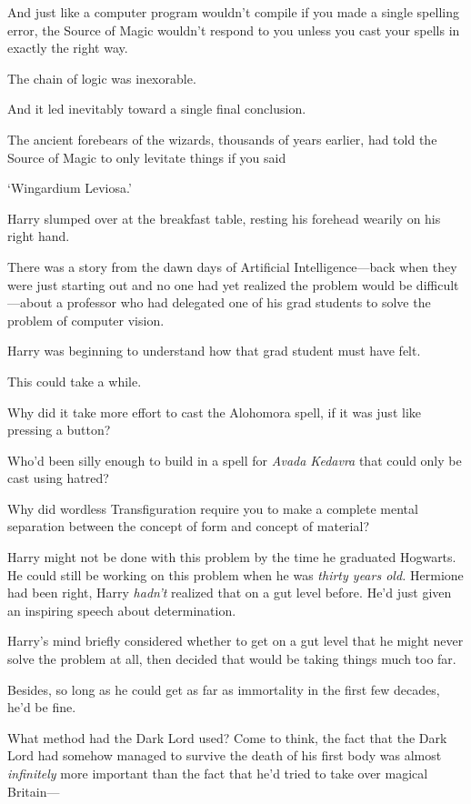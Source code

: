 And just like a computer program wouldn't compile if you made a single spelling
error, the Source of Magic wouldn't respond to you unless you cast your spells
in exactly the right way.

The chain of logic was inexorable.

And it led inevitably toward a single final conclusion.

The ancient forebears of the wizards, thousands of years earlier, had told the
Source of Magic to only levitate things if you said{\el}

`Wingardium Leviosa.'

Harry slumped over at the breakfast table, resting his forehead wearily on his
right hand.

There was a story from the dawn days of Artificial In\-tel\-li\-gence---back when
they were just starting out and no one had yet realized the problem would be
difficult---about a professor who had delegated one of his grad students to
solve the problem of computer vision.

Harry was beginning to understand how that grad student must have felt.

This could take a while.

Why did it take more effort to cast the Alohomora spell, if it was just like
pressing a button?

Who'd been silly enough to build in a spell for \emph{Avada Kedavra} that could
only be cast using hatred?

Why did wordless Transfiguration require you to make a complete mental
separation between the concept of form and concept of material?

Harry might not be done with this problem by the time he graduated Hogwarts. He
could still be working on this problem when he was \emph{thirty years old.}
Hermione had been right, Harry \emph{hadn't} realized that on a gut level
before. He'd just given an inspiring speech about determination.

Harry's mind briefly considered whether to get on a gut level that he might
never solve the problem at all, then decided that would be taking things much
too far.

Besides, so long as he could get as far as immortality in the first few
decades, he'd be fine.

What method had the Dark Lord used? Come to think, the fact that the Dark Lord
had somehow managed to survive the death of his first body was almost
\emph{infinitely} more important than the fact that he'd tried to take over
magical Britain---

